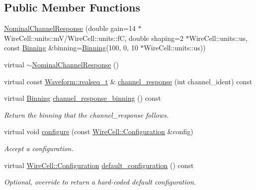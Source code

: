 \subsection*{Public Member Functions}
\begin{DoxyCompactItemize}
\item 
\hyperlink{class_wire_cell_1_1_sig_proc_1_1_nominal_channel_response_a1fc1257aff1f4477e19a2991c7eb7531}{Nominal\+Channel\+Response} (double gain=14 $\ast$Wire\+Cell\+::units\+::mV/Wire\+Cell\+::units\+::fC, double shaping=2 $\ast$Wire\+Cell\+::units\+::us, const \hyperlink{class_wire_cell_1_1_binning}{Binning} \&binning=\hyperlink{class_wire_cell_1_1_binning}{Binning}(100, 0, 10 $\ast$Wire\+Cell\+::units\+::us))
\item 
virtual \hyperlink{class_wire_cell_1_1_sig_proc_1_1_nominal_channel_response_a359424e2c7dd60340bb4e4d8e3207542}{$\sim$\+Nominal\+Channel\+Response} ()
\item 
virtual const \hyperlink{namespace_wire_cell_1_1_waveform_a479175e541c8545e87cd8063b74b6956}{Waveform\+::realseq\+\_\+t} \& \hyperlink{class_wire_cell_1_1_sig_proc_1_1_nominal_channel_response_a494997d5336628959e8585fd8d5a509d}{channel\+\_\+response} (int channel\+\_\+ident) const
\item 
virtual \hyperlink{class_wire_cell_1_1_binning}{Binning} \hyperlink{class_wire_cell_1_1_sig_proc_1_1_nominal_channel_response_a542dd1589356f39690c01ec012c21c48}{channel\+\_\+response\+\_\+binning} () const
\begin{DoxyCompactList}\small\item\em Return the binning that the channel\+\_\+response follows. \end{DoxyCompactList}\item 
virtual void \hyperlink{class_wire_cell_1_1_sig_proc_1_1_nominal_channel_response_a3e1d2284621e69ff712cc6a7a373c797}{configure} (const \hyperlink{namespace_wire_cell_a9f705541fc1d46c608b3d32c182333ee}{Wire\+Cell\+::\+Configuration} \&config)
\begin{DoxyCompactList}\small\item\em Accept a configuration. \end{DoxyCompactList}\item 
virtual \hyperlink{namespace_wire_cell_a9f705541fc1d46c608b3d32c182333ee}{Wire\+Cell\+::\+Configuration} \hyperlink{class_wire_cell_1_1_sig_proc_1_1_nominal_channel_response_a897752df4a2a548028aa1051a0b5b372}{default\+\_\+configuration} () const
\begin{DoxyCompactList}\small\item\em Optional, override to return a hard-\/coded default configuration. \end{DoxyCompactList}\end{DoxyCompactItemize}
